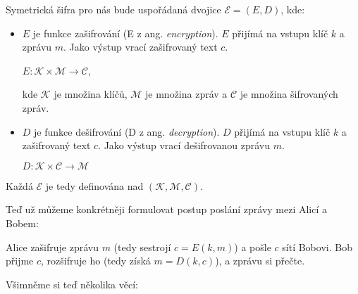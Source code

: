 \documentclass[12pt]{article}
\begin{document}

    \bigskip

    Symetrická šifra pro nás bude uspořádaná dvojice $\mathcal{E}  = (E, D)$, kde:

    \begin{itemize}
        \item
            $E$ je funkce zašifrování (E z ang. \emph{encryption}).
            $E$ přijímá na vstupu klíč $k$ a zprávu $m$.
            Jako výstup vrací zašifrovaný text $c$.

            \begin{center}
                $E: \mathcal{K} \times \mathcal{M} \rightarrow \mathcal{C}$,
            \end{center}

            kde $\mathcal{K}$ je množina klíčů, $\mathcal{M}$ je množina zpráv a 
            $\mathcal{C}$ je množina šifrovaných zpráv.

        \item
            $D$ je funkce dešifrování (D z ang. \emph{decryption}). $D$ přijímá na vstupu klíč $k$ a zašifrovaný text $c$.
            Jako výstup vrací dešifrovanou zprávu $m$.
            
            \begin{center}
                $D: \mathcal{K} \times \mathcal{C} \rightarrow \mathcal{M}$
            \end{center}

    \end{itemize}

    Každá $\mathcal{E}$ je tedy definována nad $(\mathcal{K},\mathcal{M},\mathcal{C})$.

    \medskip

    Teď už můžeme konkrétněji formulovat postup poslání zprávy mezi Alicí a Bobem:

    Alice zašifruje zprávu $m$ (tedy sestrojí $c=E(k,m)$) a pošle $c$ sítí Bobovi.
    Bob přijme $c$, rozšifruje ho (tedy získá $m=D(k,c)$), a zprávu si přečte.

    \medskip

    Všimněme si teď několika věcí:
    
\end{document}
